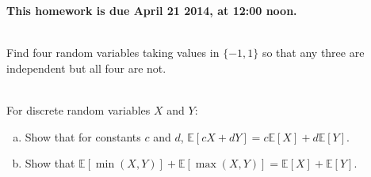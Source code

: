 \documentclass[]{article}
\newif\ifsolutions
\renewcommand{\answer}[1]{{\color{mydarkblue}\textbf{Solution:}#1}}
\begin{document}
\maketitle
{}
\vspace{0.5em}
{\Large{\textbf{This homework is due April 21 2014, at 12:00 noon.}}}

\begin{qunlist}

\\
Find four random variables taking values in $\{-1,1\}$ so that any three are independent but all four are not.

\ifsolutions{ \answer{
Let $X_1,X_2,X_3,X_4$ be i.i.d random variables with $P(X_i=1)=P(X_i=-1)=1/2$. Let $X_4=X_1X_2X_3$. Check that $X_1,X_2,X_3,X_4$ are four random variables such that any three are independent but all four are not. For example, they are not all independent because
\[
P(X_1=1,X_2=1,X_3=1,X_4=1)=1/8 \neq
P(X_1=1)P(X_2=1)P(X_3=1)P(X_4=1)
\]
}}
\fi

 \\ For discrete random variables $X$ and $Y$:
\begin{enumerate}[a)]

\qpart
\item Show that for constants $c$ and $d$, $\mathbb{E}[cX + dY] = c\mathbb{E}[X] + d \mathbb{E}[Y]$.

\ifsolutions{ \answer{ Beginning with the LHS:
		\begin{align*}
		\mathbb{E}[cX + dY] & = \sum_{x,y} (cx+dy) \mathbb{P}(x,y) \\
		& = c\sum_{x,y} x \mathbb{P}(x,y) + d\sum_{x,y} y \mathbb{P}(x,y) \\
		& = c \sum_x x \sum_y \mathbb{P}(x,y) + d \sum_y y \sum_x \mathbb{P}(x,y) \\
		& = c\sum_x x \mathbb{P}(x) + d\sum_y y \mathbb{P}(y) \\
		& = c\mathbb{E}[X] + d \mathbb{E}[Y].
		\end{align*}
}}
\fi


\qpart
\item Show that $\mathbb{E}[\min(X,Y)] + \mathbb{E}[\max(X,Y)] = \mathbb{E}[X] + \mathbb{E}[Y]$.





\end{enumerate}
\end{qunlist}
\end{document}
